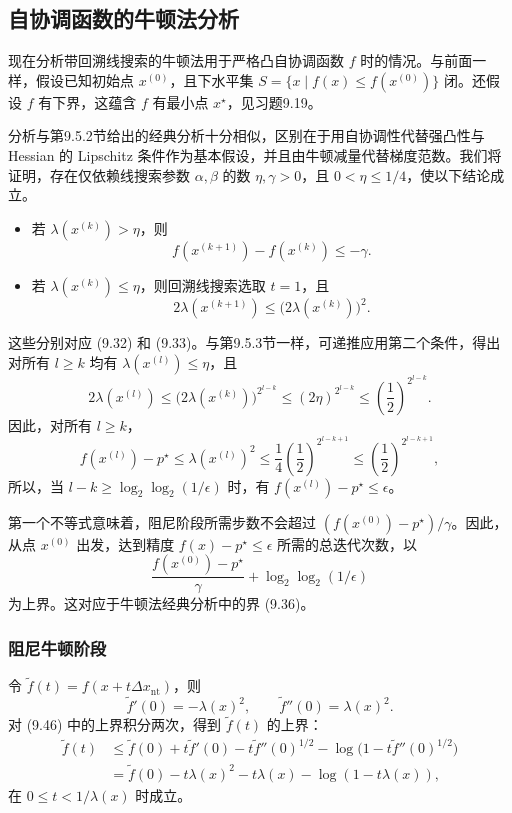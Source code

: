 \subsection{自协调函数的牛顿法分析}
现在分析带回溯线搜索的牛顿法用于严格凸自协调函数 $f$ 时的情况。与前面一样，假设已知初始点 $x^{(0)}$，且下水平集 $S=\{x\mid f(x)\le f(x^{(0)})\}$ 闭。还假设 $f$ 有下界，这蕴含 $f$ 有最小点 $x^\star$，见习题9.19。

分析与第9.5.2节给出的经典分析十分相似，区别在于用自协调性代替强凸性与 Hessian 的 Lipschitz 条件作为基本假设，并且由牛顿减量代替梯度范数。我们将证明，存在仅依赖线搜索参数 $\alpha,\beta$ 的数 $\eta,\gamma>0$，且 $0<\eta\le1/4$，使以下结论成立。
\begin{itemize}
\item 若 $\lambda(x^{(k)})>\eta$，则
\begin{equation}
 f(x^{(k+1)})-f(x^{(k)})\le-\gamma.\tag{9.51}
\end{equation}
\item 若 $\lambda(x^{(k)})\le\eta$，则回溯线搜索选取 $t=1$，且
\begin{equation}
 2\lambda(x^{(k+1)})\le\bigl(2\lambda(x^{(k)})\bigr)^2.\tag{9.52}
\end{equation}
\end{itemize}
这些分别对应 (9.32) 和 (9.33)。与第9.5.3节一样，可递推应用第二个条件，得出对所有 $l\ge k$ 均有 $\lambda(x^{(l)})\le\eta$，且
\[
 2\lambda(x^{(l)})\le\bigl(2\lambda(x^{(k)})\bigr)^{2^{l-k}}
 \le(2\eta)^{2^{l-k}}\le\left(\frac12\right)^{2^{l-k}}.
\]
因此，对所有 $l\ge k$，
\[
 f(x^{(l)})-p^\star\le\lambda(x^{(l)})^2
 \le\frac14\left(\frac12\right)^{2^{l-k+1}}
 \le\left(\frac12\right)^{2^{l-k+1}},
\]
所以，当 $l-k\ge\log_2\log_2(1/\epsilon)$ 时，有 $f(x^{(l)})-p^\star\le\epsilon$。

第一个不等式意味着，阻尼阶段所需步数不会超过 $(f(x^{(0)})-p^\star)/\gamma$。因此，从点 $x^{(0)}$ 出发，达到精度 $f(x)-p^\star\le\epsilon$ 所需的总迭代次数，以
\begin{equation}
 \frac{f(x^{(0)})-p^\star}{\gamma}+\log_2\log_2(1/\epsilon)\tag{9.53}
\end{equation}
为上界。这对应于牛顿法经典分析中的界 (9.36)。

\subsubsection*{阻尼牛顿阶段}
令 $\widetilde f(t)=f(x+t\Delta x_{\mathrm{nt}})$，则
\[
 \widetilde f'(0)=-\lambda(x)^2,\qquad
 \widetilde f''(0)=\lambda(x)^2.
\]
对 (9.46) 中的上界积分两次，得到 $\widetilde f(t)$ 的上界：
\begin{equation}
\begin{aligned}
 \widetilde f(t)&\le\widetilde f(0)+t\widetilde f'(0)-t\widetilde f''(0)^{1/2}
 -\log\bigl(1-t\widetilde f''(0)^{1/2}\bigr)\\
 &=\widetilde f(0)-t\lambda(x)^2-t\lambda(x)-\log(1-t\lambda(x)),
\end{aligned}\tag{9.54}
\end{equation}
在 $0\le t<1/\lambda(x)$ 时成立。

